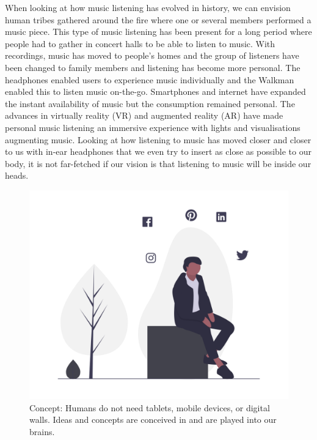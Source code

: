 \documentclass[sigchi]{acmart}
\begin{document}
When looking at how music listening has evolved in history, we can envision human tribes gathered around the fire where one or several members performed a music piece. This type of music listening has been present for a long period where people had to gather in concert halls to be able to listen to music. With recordings, music has moved to people's homes and the group of listeners have been changed to family members and listening has become more personal. The headphones enabled users to experience music individually and the Walkman enabled this to listen music on-the-go. Smartphones and internet have expanded the instant availability of music but the consumption remained personal. The advances in virtually reality (VR) and augmented reality (AR) have made personal music listening an immersive experience with lights and visualisations augmenting music. Looking at how listening to music has moved closer and closer to us with in-ear headphones that we even try to insert as close as possible to our body, it is not far-fetched if our vision is that listening to music will be inside our heads.
\begin{figure}[h]
  \centering
  \includegraphics[width=\linewidth]{acmart-master-2/samples/thinkbnw.png}
  \caption{Concept: Humans do not need tablets, mobile devices, or digital walls. Ideas and concepts are conceived in and are played into our brains.}
  \label{fig: think}
\end{figure}
\end{document}
